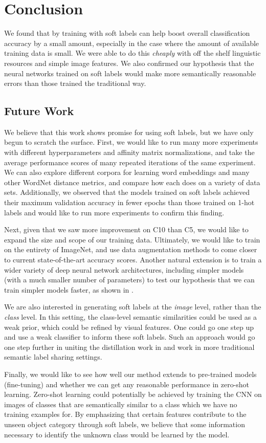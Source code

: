 \section{Conclusion}

We found that by training with soft labels can help boost overall classification
accuracy by a small amount, especially in the case where the amount of available
training data is small. We were able to do this \emph{cheaply} with off the
shelf linguistic resources and simple image features. We also confirmed
our hypothesis that the neural networks trained on soft labels would make more
semantically reasonable errors than those trained the traditional way.


\subsection{Future Work}

We believe that this work shows promise for using soft labels, but we have only
begun to scratch the surface. First, we would like to run many more experiments
with different hyperparameters and affinity matrix normalizations, and take the
average performance scores of many repeated iterations of the same experiment.
We can also explore different corpora for learning word embeddings and many
other WordNet distance metrics, and compare how each does on a variety of data
sets. Additionally, we observed that the models trained on soft labels achieved
their maximum validation accuracy in fewer epochs than those trained on 1-hot
labels and would like to run more experiments to confirm this finding.  

Next, given that we saw more improvement on C10 than C5, we would like to expand
the size and scope of our training data. Ultimately, we would like to train on
the entirety of ImageNet, and use data augmentation methods to come closer to
current state-of-the-art accuracy scores. Another natural extension is to train
a wider variety of deep neural network architectures, including simpler models
(with a much smaller number of parameters) to test our hypothesis that we can
train simpler models faster, as shown in \cite{hinton2015distilling}.

We are also interested in generating soft labels at the \emph{image} level,
rather than the \emph{class} level. In this setting, the class-level semantic
similarities could be used as a weak prior, which could be refined by visual
features. One could go one step up and use a weak classifier to inform these
soft labels. Such an approach would go one step further in uniting the
distillation work in \cite{hinton2015distilling} and work in more traditional
semantic label sharing settings.

Finally, we would like to see how well our method extends to pre-trained models
(fine-tuning) and whether we can get any reasonable performance in zero-shot
learning. Zero-shot learning could potentially be achieved by training the CNN
on images of classes that are semantically similar to a class which we have no
training examples for. By emphasizing that certain features contribute to the
unseen object category through soft labels, we believe that some information
necessary to identify the unknown class would be learned by the model.
